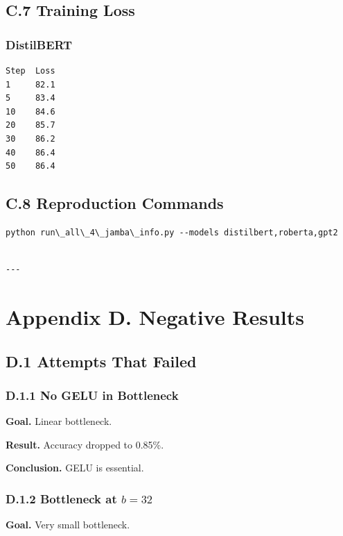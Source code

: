 \subsection{C.7 Training Loss}

\subsubsection{DistilBERT}
\begin{lstlisting}
Step  Loss
1     82.1
5     83.4
10    84.6
20    85.7
30    86.2
40    86.4
50    86.4
\end{lstlisting}

\subsection{C.8 Reproduction Commands}

\begin{lstlisting}
python run\_all\_4\_jamba\_info.py --models distilbert,roberta,gpt2
\end{lstlisting}
\begin{lstlisting}

---
\end{lstlisting}

\section{Appendix D. Negative Results}

\subsection{D.1 Attempts That Failed}

\subsubsection{D.1.1 No GELU in Bottleneck}

\textbf{Goal.} Linear bottleneck.

\textbf{Result.} Accuracy dropped to 0.85\%.

\textbf{Conclusion.} GELU is essential.

\subsubsection{D.1.2 Bottleneck at $b = 32$}

\textbf{Goal.} Very small bottleneck.

